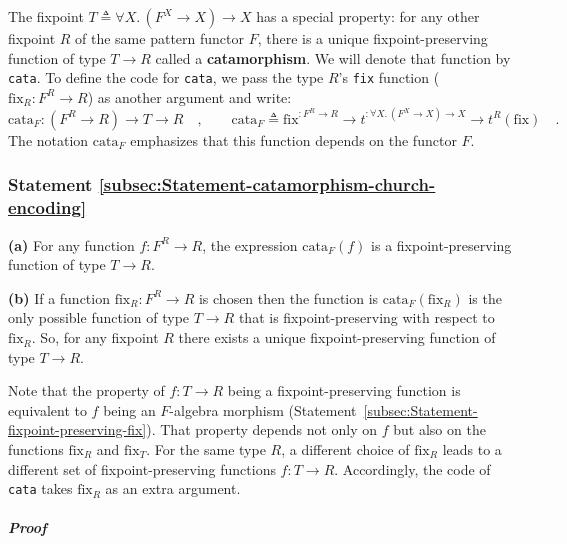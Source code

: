 The fixpoint $T\triangleq\forall X.\,(F^{X}\rightarrow X)\rightarrow X$
has a special property: for any other fixpoint $R$ of the same pattern
functor $F$, there is a unique fixpoint-preserving function of type
$T\rightarrow R$ called a \textbf{catamorphism}.
We will denote that function by \lstinline!cata!. To define the code
for \lstinline!cata!, we pass the type $R$\textsf{'}s \lstinline!fix! function
($\text{fix}_{R}:F^{R}\rightarrow R$) as another argument and write:
\begin{equation}
\text{cata}_{F}:(F^{R}\rightarrow R)\rightarrow T\rightarrow R\quad,\quad\quad\text{cata}_{F}\triangleq\text{fix}^{:F^{R}\rightarrow R}\rightarrow t^{:\forall X.\,(F^{X}\rightarrow X)\rightarrow X}\rightarrow t^{R}(\text{fix})\quad.\label{eq:definition-of-catamorphism}
\end{equation}
The notation $\text{cata}_{F}$ emphasizes that this function depends
on the functor $F$.

\subsubsection{Statement \label{subsec:Statement-catamorphism-church-encoding}\ref{subsec:Statement-catamorphism-church-encoding}}

\textbf{(a)} For any function $f:F^{R}\rightarrow R$, the expression
$\text{cata}_{F}(f)$ is a fixpoint-preserving function of type $T\rightarrow R$.

\textbf{(b)} If a function $\text{fix}_{R}:F^{R}\rightarrow R$ is
chosen then the function is $\text{cata}_{F}(\text{fix}_{R})$ is
the only possible function of type $T\rightarrow R$ that is fixpoint-preserving
with respect to $\text{fix}_{R}$. So, for any fixpoint $R$ there
exists a unique fixpoint-preserving function of type $T\rightarrow R$.

Note that the property of $f:T\rightarrow R$ being a fixpoint-preserving
function is equivalent to $f$ being an $F$-algebra morphism (Statement~\ref{subsec:Statement-fixpoint-preserving-fix}).
That property depends not only on $f$ but also on the functions $\text{fix}_{R}$
and $\text{fix}_{T}$. For the same type $R$, a different choice
of $\text{fix}_{R}$ leads to a different set of fixpoint-preserving
functions $f:T\rightarrow R$. Accordingly, the code of \lstinline!cata!
takes $\text{fix}_{R}$ as an extra argument.

\subparagraph{Proof}

